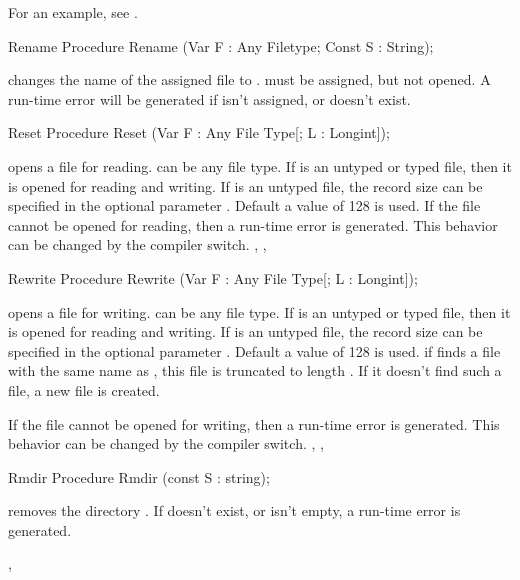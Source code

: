 \documentclass{report}
\begin{document}
For an example, see .
\begin{procedure}{Rename}
\Declaration
Procedure Rename (Var F : Any Filetype; Const S : String);

\Description
{} changes the name of the assigned file  to .
must be assigned, but not opened.
\Errors
A run-time error will be generated if  isn't assigned, 
or doesn't exist.
\SeeAlso
{}
\end{procedure}
\html{}
\begin{procedure}{Reset}
\Declaration
Procedure Reset (Var F : Any File Type[; L : Longint]);

\Description
{} opens a file  for reading.  can be any file type.
If  is an untyped or typed file, then it is opened for reading and 
writing. If  is an untyped file, the record size can be specified in 
the optional parameter . Default a value of 128 is used.
\Errors
If the file cannot be opened for reading, then a run-time error is
generated. This behavior can be changed by the  compiler switch.
\SeeAlso
{}, , 
\end{procedure}
\html{}
\begin{procedure}{Rewrite}
\Declaration
Procedure Rewrite (Var F : Any File Type[; L : Longint]);

\Description
{} opens a file  for writing.  can be any file type.
If  is an untyped or typed file, then it is opened for reading and 
writing. If  is an untyped file, the record size can be specified in 
the optional parameter . Default a value of 128 is used.
if  finds a file with the same name as , this file is
truncated to length . If it doesn't find such a file, a new file is 
created.

\Errors
If the file cannot be opened for writing, then a run-time error is
generated. This behavior can be changed by the  compiler switch.
\SeeAlso
{}, , 
\end{procedure}
\html{}
\begin{procedure}{Rmdir}
\Declaration
Procedure Rmdir (const S : string);

\Description
{} removes the  directory .
\Errors
If  doesn't exist, or isn't empty, a run-time error is generated.

\SeeAlso
{}, 
\end{procedure}
\end{document}
